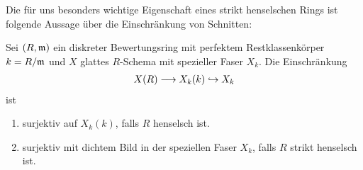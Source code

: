 Die für uns besonders wichtige Eigenschaft eines strikt henselschen
Rings ist folgende Aussage über die Einschränkung von Schnitten:
\begin{Satz}
  \label{thm:eigstrikthenselsch}
  Sei $(R,\mathfrak{m})$ ein diskreter Bewertungsring mit perfektem
  Restklassenkörper $k=R/\mathfrak{m}$ und $X$ glattes $R$-Schema mit spezieller
  Faser $X_k$.
  Die Einschränkung
  \begin{gather*}
    X(R)\longrightarrow X_k(k)\hookrightarrow X_k
  \end{gather*}
  ist
  \begin{enumerate}[label=(\roman*)]
  \item surjektiv auf $X_k(k)$, falls $R$ henselsch ist.
  \item surjektiv mit dichtem Bild in der speziellen Faser $X_k$,
    falls $R$ strikt henselsch ist.
  \end{enumerate}
\end{Satz}

